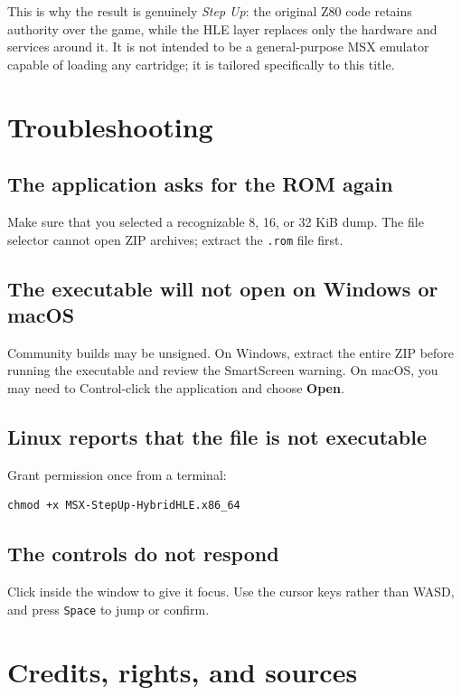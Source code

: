 \documentclass[11pt,a4paper]{article}
\newcommand{\keycap}[1]{%
  \begingroup
  \setlength{\fboxsep}{3pt}%
  \colorbox{softgray}{\texttt{#1}}%
  \endgroup
}
\begin{document}
This is why the result is genuinely \textit{Step Up}: the original Z80 code
retains authority over the game, while the HLE layer replaces only the
hardware and services around it. It is not intended to be a general-purpose
MSX emulator capable of loading any cartridge; it is tailored specifically to
this title.

\section{Troubleshooting}

\subsection*{The application asks for the ROM again}

Make sure that you selected a recognizable 8, 16, or 32 KiB dump. The file
selector cannot open ZIP archives; extract the \texttt{.rom} file first.

\subsection*{The executable will not open on Windows or macOS}

Community builds may be unsigned. On Windows, extract the entire ZIP before
running the executable and review the SmartScreen warning. On macOS, you may
need to Control-click the application and choose \textbf{Open}.

\subsection*{Linux reports that the file is not executable}

Grant permission once from a terminal:

\begin{verbatim}
chmod +x MSX-StepUp-HybridHLE.x86_64
\end{verbatim}

\subsection*{The controls do not respond}

Click inside the window to give it focus. Use the cursor keys rather than
WASD, and press \keycap{Space} to jump or confirm.

\section{Credits, rights, and sources}
\end{document}
